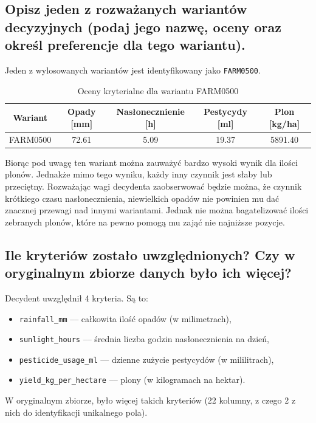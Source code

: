 \documentclass[11pt]{article}
\begin{document}
\subsection{Opisz jeden z rozważanych wariantów decyzyjnych (podaj jego nazwę, oceny oraz określ preferencje dla tego wariantu).}
Jeden z wylosowanych wariantów jest identyfikowany jako \texttt{FARM0500}.
\begin{table}[H]
\centering
\begin{tabular}{|c||c|c|c|c|}
\hline
\textbf{Wariant} & \textbf{Opady [mm]} & \textbf{Nasłonecznienie [h]} & \textbf{Pestycydy [ml]} & \textbf{Plon [kg/ha]} \\
\hline
FARM0500 & 72.61 & 5.09 & 19.37 & 5891.40 \\
\hline
\end{tabular}
\caption{Oceny kryterialne dla wariantu FARM0500}
\end{table}
Biorąc pod uwagę ten wariant można zauważyć bardzo wysoki wynik dla ilości plonów. Jednakże mimo tego wyniku, każdy inny czynnik jest słaby lub przeciętny. Rozważając wagi decydenta zaobserwować będzie można, że czynnik krótkiego czasu nasłonecznienia, niewielkich opadów nie powinien mu dać znacznej przewagi nad innymi wariantami. Jednak nie można bagatelizować ilości zebranych plonów, które na pewno pomogą mu zająć nie najniższe pozycje.

\subsection{Ile kryteriów zostało uwzględnionych? Czy w oryginalnym zbiorze danych było ich więcej?}
Decydent uwzględnił 4 kryteria. Są to:
\begin{itemize}
    \item \texttt{rainfall\_mm} --– całkowita ilość opadów (w milimetrach),
    \item \texttt{sunlight\_hours} –-- średnia liczba godzin nasłonecznienia na dzień,
    \item \texttt{pesticide\_usage\_ml} –-- dzienne zużycie pestycydów (w mililitrach),
    \item \texttt{yield\_kg\_per\_hectare} –-- plony (w kilogramach na hektar).
\end{itemize}
W oryginalnym zbiorze, było więcej takich kryteriów (22 kolumny, z czego 2 z nich do identyfikacji unikalnego pola).
\end{document}
